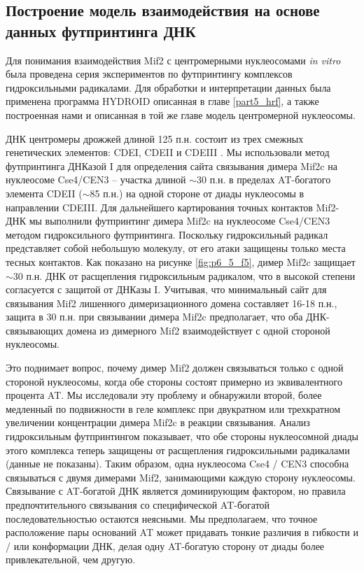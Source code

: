 \subsection{Построение модель взаимодействия на основе данных футпринтинга ДНК}
Для понимания взаимодействия Mif2 с центромерными нуклеосомами \textit{in vitro} была проведена серия экспериментов по футпринтингу комплексов гидроксильными радикалами. Для обработки и интерпретации данных была применена программа HYDROID описанная в главе \ref{part5_hrf}, а также построенная нами и описанная в той же главе модель центромерной нуклеосомы.

ДНК центромеры дрожжей длиной 125 п.н. состоит из трех смежных генетических элементов: CDEI, CDEII и CDEIII \cite{hegemann_centromere_1993}. Мы использовали метод футпринтинга ДНКазой I для определения сайта связывания димера Mif2c на нуклеосоме Cse4/CEN3 -- участка длиной  $\sim$30 п.н. в пределах AT-богатого элемента CDEII ($\sim$85 п.н.) на одной стороне от диады нуклеосомы в направлении CDEIII. Для дальнейшего картирования точных контактов Mif2-ДНК мы выполнили футпринтинг димера Mif2c на нуклеосоме Cse4/CEN3 методом гидроксильного футпринтинга. Поскольку гидроксильный радикал представляет собой небольшую молекулу, от его атаки защищены только места тесных контактов. Как показано на рисунке  \ref{fig:p6_5_f5}, димер Mif2c защищает $\sim$30 п.н. ДНК от расщепления гидроксильным радикалом, что в высокой степени согласуется с защитой от ДНКазы I. Учитывая, что минимальный сайт для связывания  Mif2 лишенного димеризационного домена составляет 16-18 п.н., защита в 30 п.н. при связывании димера Mif2c предполагает, что оба ДНК-связывающих домена из димерного Mif2 взаимодействует с одной стороной нуклеосомы.

Это поднимает вопрос, почему димер Mif2 должен связываться только с одной стороной нуклеосомы, когда обе стороны состоят примерно из эквивалентного процента AT. Мы исследовали эту проблему и обнаружили второй, более медленный по подвижности в геле комплекс при двукратном или трехкратном увеличении концентрации димера Mif2c в реакции связывания. Анализ гидроксильным футпринтингом показывает, что обе стороны нуклеосомной диады этого комплекса теперь защищены от расщепления гидроксильными радикалами (данные не показаны). Таким образом, одна нуклеосома Cse4 / CEN3 способна связываться с двумя димерами Mif2, занимающими каждую сторону нуклеосомы. Связывание с AT-богатой ДНК является доминирующим фактором, но правила предпочтительного связывания со специфической AT-богатой последовательностью остаются неясными. Мы предполагаем, что точное расположение пары оснований AT может придавать тонкие различия в гибкости и / или конформации ДНК, делая одну AT-богатую сторону от диады более привлекательной, чем другую.

